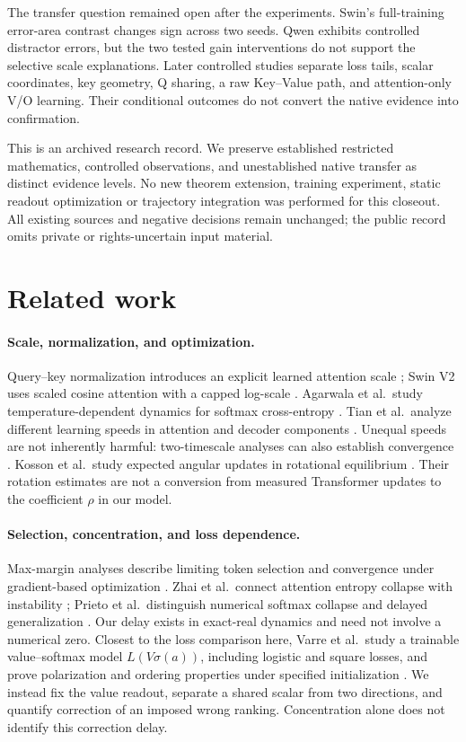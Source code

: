 \documentclass[10pt,a4paper]{article}
\begin{document}
The transfer question remained open after the experiments. Swin's full-training error-area contrast changes sign across two seeds. Qwen exhibits controlled distractor errors, but the two tested gain interventions do not support the selective scale explanations. Later controlled studies separate loss tails, scalar coordinates, key geometry, Q sharing, a raw Key--Value path, and attention-only V/O learning. Their conditional outcomes do not convert the native evidence into confirmation.

This is an archived research record. We preserve established restricted mathematics, controlled observations, and unestablished native transfer as distinct evidence levels. No new theorem extension, training experiment, static readout optimization or trajectory integration was performed for this closeout. All existing sources and negative decisions remain unchanged; the public record omits private or rights-uncertain input material.

\section{Related work}
\paragraph{Scale, normalization, and optimization.}
Query--key normalization introduces an explicit learned attention scale \cite{henry2020}; Swin V2 uses scaled cosine attention with a capped log-scale \cite{liu2022}. Agarwala et al.\ study temperature-dependent dynamics for softmax cross-entropy \cite{agarwala}. Tian et al.\ analyze different learning speeds in attention and decoder components \cite{tian2023}. Unequal speeds are not inherently harmful: two-timescale analyses can also establish convergence \cite{marion2023}. Kosson et al.\ study expected angular updates in rotational equilibrium \cite{kosson}. Their rotation estimates are not a conversion from measured Transformer updates to the coefficient $\rho$ in our model.

\paragraph{Selection, concentration, and loss dependence.}
Max-margin analyses describe limiting token selection and convergence under gradient-based optimization \cite{tarzanaghmax,vasudeva}. Zhai et al.\ connect attention entropy collapse with instability \cite{zhai2023}; Prieto et al.\ distinguish numerical softmax collapse and delayed generalization \cite{prieto2025}. Our delay exists in exact-real dynamics and need not involve a numerical zero. Closest to the loss comparison here, Varre et al.\ study a trainable value--softmax model $L(V\sigma(a))$, including logistic and square losses, and prove polarization and ordering properties under specified initialization \cite{varre}. We instead fix the value readout, separate a shared scalar from two directions, and quantify correction of an imposed wrong ranking. Concentration alone does not identify this correction delay.
\end{document}
